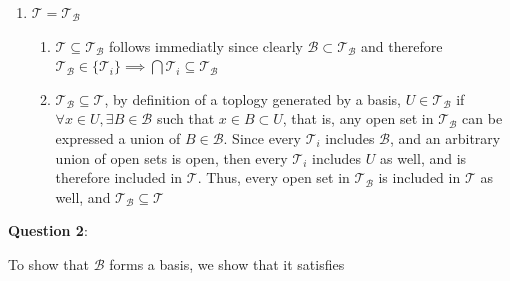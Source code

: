 \documentclass{article} %
\newcommand{\question}[2][]{
  \begin{flushleft}
    \textbf{Question #1}: \textit{#2}

\end{flushleft}}
\begin{document}
\begin{enumerate}[label=\alph*)]
\begin{enumerate}
    \item To show that the union of any sets in $\mathcal{T}$ are in
      $\mathcal{T}$ notice that
      \[
        \forall U \in \mathcal{T} \equiv U \in \bigcap \mathcal{T}_i \implies
        \forall \mathcal{T}_i, U \in \mathcal{T}_i
      \]
      That is, for all open sets in $\mathcal{T}$, they must be in
      every topology $\mathcal{T}_i$ in the intersection. From the
      definition of a topology and what was established above, for any
      collection of open sets in $\mathcal{T}$, $\{U_j\}$ and any
      topology in the intersection $\mathcal{T}_i$
      $$
      \bigcup U_j \in \mathcal{T}_i \implies \bigcup U_j \in \mathcal{T}
      $$
    \item To show that a finite intersection of open sets of
      $\mathcal{T}$ is in $\mathcal{T}$, consider a finite collection
      of sets in $\mathcal{T}$, $\{U_j\}$. As we demonstrated in (2),
      every topology must include every $U_j$. As such
      \[
        \forall i, j \bigcap U_j \in \mathcal{T}_i \implies \bigcap U_j
        \in \mathcal{T}
      \]
  \end{enumerate}
  Thus, $\mathcal{T}$ is a topology.
\item $\mathcal{T} = \mathcal{T}_\mathcal{B}$
  \begin{enumerate}
    \item $\mathcal{T} \subseteq \mathcal{T}_\mathcal{B}$ follows
      immediatly since clearly $\mathcal{B} \subset
      \mathcal{T}_\mathcal{B}$ and therefore $\mathcal{T}_\mathcal{B}
      \in \{\mathcal{T}_i\} \implies \bigcap \mathcal{T}_i \subseteq
      \mathcal{T}_\mathcal{B}$
    \item $\mathcal{T}_\mathcal{B} \subseteq \mathcal{T}$, by
      definition of a toplogy generated by a basis, $U \in
      \mathcal{T}_\mathcal{B}$ if $\forall x \in U, \exists B \in
      \mathcal{B}$ such that $x \in B \subset U$, that is, any open
      set in $\mathcal{T}_\mathcal{B}$ can be expressed a union of $B
      \in \mathcal{B}$. Since every $\mathcal{T}_i$ includes
      $\mathcal{B}$, and an arbitrary union of open sets is open,
      then every $\mathcal{T}_i$ includes $U$ as well, and is
      therefore included in $\mathcal{T}$. Thus, every open set in
      $\mathcal{T}_\mathcal{B}$ is included in $\mathcal{T}$ as well,
      and $\mathcal{T}_\mathcal{B} \subseteq \mathcal{T}$
  \end{enumerate}

\end{enumerate}
\question[2]{}
To show that $\mathcal{B}$ forms a basis, we show that it satisfies
\end{document}
